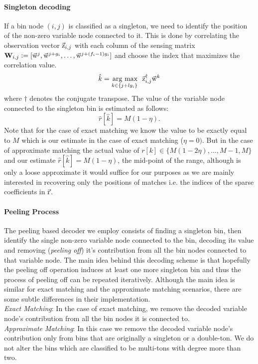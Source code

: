 \paragraph*{Singleton decoding}
 {\color{blue}{(Add a note on clustering scheme as extensions)}}If a bin node $(i,j)$ is classified as a singleton, we need to identify the position of the non-zero variable node connected to it. This is done by correlating the observation vector $\vec{\mathrm{z}}_{i,j}$ with each column of the sensing matrix  $\mathbf{W}_{i,j} \mathrel{\mathop:}= [\vec{\mathrm{w}}^{j},\vec{\mathrm{w}}^{j+g_i},\ldots,   \vec{\mathrm{w}}^{j+(f_i-1)g_i}]$ and choose the index that maximizes the correlation value.
\begin{align*}
 \hat{k} = \underset{k\in\{j+l g_i\}}{\operatorname*{\,arg\ max}}~~ \vec{\mathrm{z}}^{\dagger}_{i,j} \vec{\mathrm{w}}^{k}
\end{align*}
where $\dagger$ denotes the conjugate transpose. The value of the variable node connected to the singleton bin is estimated as follows:
 $$
 \hat{r}[\hat{k}]=M(1-\eta).
 $$
 Note that for the case of exact matching we know the value to be exactly equal to $M$ which is our estimate in the case of exact matching ($\eta=0)$. But in the case of approximate matching the actual value of $r[k]\in\{M(1-2\eta),\ldots,M-1,M\}$ and our estimate $ \hat{r}[\hat{k}]=M(1-\eta)$, the mid-point of the range, although is only a loose approximate it would suffice for our purposes as we are mainly interested in recovering only the positions of matches i.e. the indices of the sparse coefficients in $\vec{\mathrm{r}}$.			
\paragraph*{Peeling Process} The peeling based decoder we employ consists of finding a singleton bin, then identify the single non-zero variable node connected to the bin, decoding its value and removing ({\it peeling off}) it's contribution from all the bin nodes connected to that variable node. The main idea behind this decoding scheme is that hopefully the peeling off operation induces at least one more singleton bin and thus the process of peeling off can be repeated iteratively. Although the main idea is similar for exact matching and the approximate matching scenarios, there are some subtle differences in their implementation.\\
{\it Exact Matching}: In the case of exact matching, we remove the decoded variable node's contribution from all the bin nodes it is connected to.\\
{\it Approximate Matching}: In this case we remove the decoded variable node's contribution only from bins that are originally a singleton or a double-ton. We do not alter the bins which are classified to be multi-tons with degree more than two.

